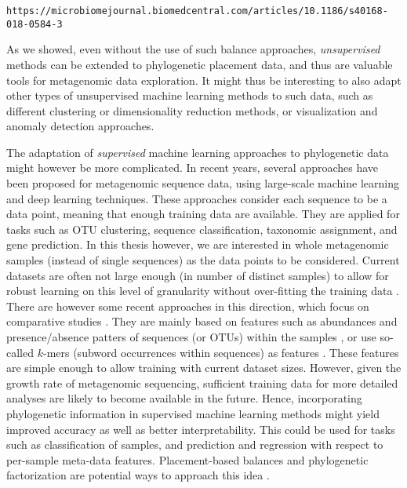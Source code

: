  \verb|https://microbiomejournal.biomedcentral.com/articles/10.1186/s40168-018-0584-3|

As we showed, even without the use of such balance approaches,
\emph{unsupervised} methods can be extended to phylogenetic placement data,
and thus are valuable tools for metagenomic data exploration.
It might thus be interesting to also adapt other types of unsupervised machine learning methods to such data,
such as different clustering \cite{Kriegel2011} or dimensionality reduction \cite{VanDerMaaten2008} methods,
or visualization \cite{Laczny2014} and anomaly detection approaches.

The adaptation of \emph{supervised} machine learning approaches to phylogenetic data might however be more complicated.
In recent years, several approaches have been proposed for metagenomic sequence data,
using large-scale machine learning \cite{Vervier2015,Soueidan2015}
and deep learning \cite{Angermueller2016,Fiannaca2018} techniques.
These approaches consider each sequence to be a data point, meaning that enough training data are available.
They are applied for tasks such as OTU clustering, sequence classification, taxonomic assignment, and gene prediction.
In this thesis however, we are interested in whole metagenomic samples (instead of single sequences)
as the data points to be considered.
Current datasets are often not large enough (in number of distinct samples)
to allow for robust learning on this level of granularity without over-fitting the training data \cite{Angermueller2016}.
There are however some recent approaches in this direction, which focus on comparative studies \cite{Soueidan2015}.
They are mainly based on features such as
abundances and presence/absence patters of sequences (or \acsp{OTU}) within the samples \cite{Pasolli2016},
or use so-called $k$-mers (subword occurrences within sequences) as features \cite{Asgari2015}.
These features are simple enough to allow training with current dataset sizes.
However, given the growth rate of metagenomic sequencing,
sufficient training data for more detailed analyses are likely to become available in the future.
Hence, incorporating phylogenetic information in supervised machine learning methods might yield
improved accuracy as well as better interpretability.
This could be used for tasks such as classification of samples,
and prediction and regression with respect to per-sample meta-data features.
Placement-based balances and phylogenetic factorization
are potential ways to approach this idea \cite{Silverman2017,Washburne2017a}.

